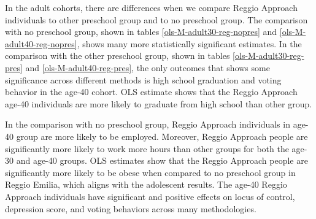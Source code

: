 In the adult cohorts, there are differences when we compare Reggio Approach individuals to other preschool group and to no preschool group. The comparison with no preschool group, shown in tables \ref{ols-M-adult30-reg-nopres} and \ref{ols-M-adult40-reg-nopres}, shows many more statistically significant estimates. In the comparison with the other preschool group, shown in tables \ref{ols-M-adult30-reg-pres} and \ref{ols-M-adult40-reg-pres}, the only outcomes that shows some significance across different methods is high school graduation and voting behavior in the age-40 cohort. OLS estimate shows that the Reggio Approach age-40 individuals are more likely to graduate from high school than other group. 

In the comparison with no preschool group, Reggio Approach individuals in age-40 group are more likely to be employed. Moreover, Reggio Approach people are significantly more likely to work more hours than other groups for both the age-30 and age-40 groups. OLS estimates show that the Reggio Approach people are significantly more likely to be obese when compared to no preschool group in Reggio Emilia, which aligns with the adolescent results. The age-40 Reggio Approach individuals have significant and positive effects on locus of control, depression score, and voting behaviors across many methodologies. 



